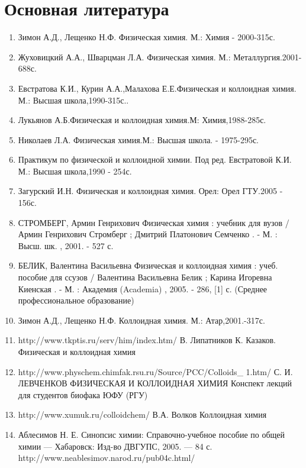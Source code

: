 \section*{Основная литература}
\begin{enumerate}
\item Зимон А.Д., Лещенко Н.Ф. Физическая химия. М.: Химия - 2000-315с.
\item Жуховицкий А.А., Шварцман Л.А. Физическая химия. М.: Металлургия.2001-688с.
\item Евстратова К.И., Курин А.А.,Малахова Е.Е.Физическая и коллоидная химия. М.: Высшая школа,1990-315с..
\item Лукьянов А.Б.Физическая и коллоидная химия.М: Химия,1988-285с.
\item Николаев Л.А. Физическая химия.М.: Высшая школа. - 1975-295с.
\item Практикум по физической и коллоидной химии. Под ред. Евстратовой К.И. М.: Высшая школа,1990 - 254с.
\item Загурский И.Н. Физическая и коллоидная химия. Орел: Орел ГТУ.2005 - 156с.
\item  СТРОМБЕРГ, Армин Генрихович Физическая химия : учебник для вузов / Армин Генрихович Стромберг ; Дмитрий Платонович Семченко . - М. : Высш. шк. , 2001. - 527 с.
\item  БЕЛИК, Валентина Васильевна
Физическая и коллоидная химия : учеб. пособие для ссузов / Валентина Васильевна Белик ; Карина Игоревна Киенская . - М. : Академия (Academia) , 2005. - 286, [1] с. (Среднее профессиональное образование)
\item Зимон А.Д., Лещенко Н.Ф. Коллоидная химия. М.: Атар,2001.-317с.
\item http://www.tkptis.ru/serv/him/index.htm/ В. Липатников К. Казаков. Физическая и коллоидная химия
\item http://www.physchem.chimfak.rsu.ru/Source/PCC/Colloids\_ 1.htm/ 
С. И. ЛЕВЧЕНКОВ ФИЗИЧЕСКАЯ И КОЛЛОИДНАЯ ХИМИЯ Конспект лекций для студентов биофака ЮФУ (РГУ)
\item http://www.xumuk.ru/colloidchem/ В.А. Волков Коллоидная химия
\item Аблесимов Н. Е. Синопсис химии: Справочно-учебное пособие по общей химии — Хабаровск: Изд-во ДВГУПС, 2005. — 84 с.
http://www.neablesimov.narod.ru/pub04c.html/
\end{enumerate}
